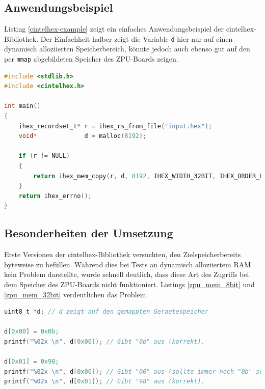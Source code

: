 \documentclass[11pt]{scrartcl}
\begin{document}
\subsection{Anwendungsbeispiel}

Listing \ref{cintelhex-example} zeigt ein einfaches Anwendungsbeispiel der cintelhex-Bibliothek. Der Einfachheit halber zeigt die Variable \texttt{d} hier nur auf einen dynamisch alloziierten Speicherbereich, könnte jedoch auch ebenso gut auf den per \texttt{mmap} abgebildeten Speicher des ZPU-Boards zeigen.

\begin{lstlisting}[language=C,caption=Anwendungsbeispiel der cintelhex-Bibliothek,label=cintelhex-example]
#include <stdlib.h>
#include <cintelhex.h>

int main()
{
	ihex_recordset_t* r = ihex_rs_from_file("input.hex");
	void*             d = malloc(8192);
	
	if (r != NULL)
	{
		return ihex_mem_copy(r, d, 8192, IHEX_WIDTH_32BIT, IHEX_ORDER_BIGENDIAN);
	}
	return ihex_errno();
}
\end{lstlisting}

\subsection{Besonderheiten der Umsetzung}


Erste Versionen der cintelhex-Bibliothek versuchten, den Zielspeicherbereits byteweise zu befüllen. Während dies bei Tests an dynamisch alloziiertem RAM kein Problem darstellte, wurde schnell deutlich, dass diese Art des Zugriffs bei dem Speicher des ZPU-Boards nicht funktioniert. Listings \ref{zpu_mem_8bit} und \ref{zpu_mem_32bit} verdeutlichen das Problem.

\begin{lstlisting}[float=p,language=C,caption=Unerwartetes Verhalten des ZPU-Speichers bei 8-Bit-Zugriff,morekeywords={uint8_t,uint32_t},label=zpu_mem_8bit]
uint8_t *d; // d zeigt auf den gemappten Geraetespeicher

d[0x00] = 0x0b;
printf("%02x \n", d[0x00]); // Gibt "0b" aus (korrekt).

d[0x01] = 0x98;
printf("%02x \n", d[0x00]); // Gibt "00" aus (sollte immer noch "0b" sein)!
printf("%02x \n", d[0x01]); // Gibt "98" aus (korrekt).
\end{lstlisting}
\end{document}
